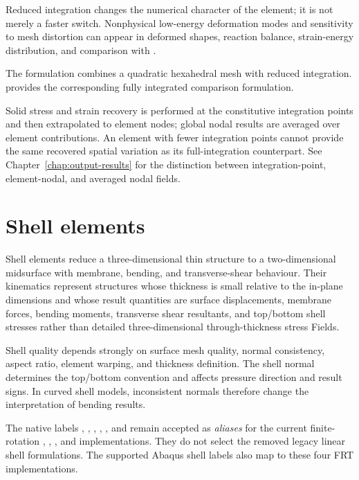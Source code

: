 Reduced integration changes the numerical character of the element; it is not merely a faster switch. Nonphysical low-energy deformation modes and sensitivity to mesh distortion can appear in deformed shapes, reaction balance, strain-energy distribution, and comparison with .

The formulation combines a quadratic hexahedral mesh with reduced integration.  provides the corresponding fully integrated comparison formulation.

Solid stress and strain recovery is performed at the constitutive integration points and then extrapolated to element nodes; global nodal results are averaged over element contributions. An element with fewer integration points cannot provide the same recovered spatial variation as its full-integration counterpart. See Chapter~\ref{chap:output-results} for the distinction between integration-point, element-nodal, and averaged nodal fields.

\section{Shell elements}

Shell elements reduce a three-dimensional thin structure to a two-dimensional midsurface with membrane, bending, and transverse-shear behaviour. Their kinematics represent structures whose thickness is small relative to the in-plane dimensions and whose result quantities are surface displacements, membrane forces, bending moments, transverse shear resultants, and top/bottom shell stresses rather than detailed three-dimensional through-thickness stress Fields.

Shell quality depends strongly on surface mesh quality, normal consistency, aspect ratio, element warping, and thickness definition. The shell normal determines the top/bottom convention and affects pressure direction and result signs. In curved shell models, inconsistent normals therefore change the interpretation of bending results.

\begin{warningbox}
The native labels , , , , , and  remain accepted as \emph{aliases} for the current finite-rotation , , , and  implementations. They do not select the removed legacy linear shell formulations. The supported Abaqus shell labels also map to these four FRT implementations.
\end{warningbox}

